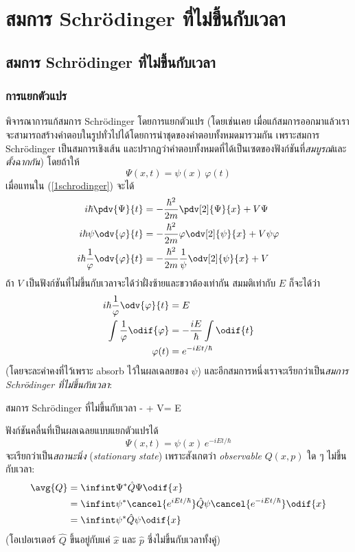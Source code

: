 \chapter{สมการ Schrödinger ที่ไม่ขึ้นกับเวลา}

\section{สมการ Schrödinger ที่ไม่ขึ้นกับเวลา}

\subsection{การแยกตัวแปร}

พิจารณาการแก้สมการ Schrödinger โดยการแยกตัวแปร (โดยเช่นเคย เมื่อแก้สมการออกมาแล้วเราจะสามารถสร้างคำตอบในรูปทั่วไปได้โดยการนำชุดของคำตอบทั้งหมดมารวมกัน เพราะสมการ Schrödinger เป็นสมการเชิงเส้น และปรากฏว่าคำตอบทั้งหมดที่ได้เป็นเซตของฟังก์ชันที่\emph{สมบูรณ์}และ\emph{ตั้งฉากกัน}) โดยถ้าให้
\[
\Psi(x, t) = \psi(x)\,\varphi(t)
\]
เมื่อแทนใน (\ref{1schrodinger}) จะได้
\begin{align*}
    i\hbar\pdv{\Psi}{t} &= -\frac{\hbar^2}{2m} \pdv[2]{\Psi}{x} + V\Psi\\
    i\hbar\psi\odv{\varphi}{t} &= -\frac{\hbar^2}{2m}\varphi\odv[2]{\psi}{x} + V\psi\varphi\\
    i\hbar\frac{1}{\varphi}\odv{\varphi}{t} &= -\frac{\hbar^2}{2m}\frac{1}{\psi}\odv[2]{\psi}{x} + V
\end{align*}
ถ้า $V$ เป็นฟังก์ชันที่ไม่ขึ้นกับเวลาจะได้ว่าฝั่งซ้ายและขวาต้องเท่ากัน สมมติเท่ากับ $E$ ก็จะได้ว่า
\begin{align}
    i\hbar\frac{1}{\varphi}\odv{\varphi}{t} &= E\notag\\
    \int\frac{1}{\varphi}\odif{\varphi} &= -\frac{iE}{\hbar}\int\odif{t}\notag\\
    \varphi(t) &= e^{-iEt/\hbar}
\end{align}
(โดยจะละค่าคงที่ไว้เพราะ absorb ไว้ในผลเฉลยของ $\psi$) และอีกสมการหนึ่งเราจะเรียกว่าเป็น\emph{สมการ Schrödinger ที่ไม่ขึ้นกับเวลา}: 
\begin{ieqbox}{สมการ Schrödinger ที่ไม่ขึ้นกับเวลา}
    - + V\psi = E\psi\label{2timeindepschrodinger}
\end{ieqbox}

ฟังก์ชันคลื่นที่เป็นผลเฉลยแบบแยกตัวแปรได้
\begin{equation}
    \Psi(x, t) = \psi(x)\,e^{-iEt/\hbar}
\end{equation}
จะเรียกว่าเป็น\emph{สถานะนิ่ง} (\emph{stationary state}) เพราะสังเกตว่า \emph{observable} $Q(x, p)$ ใด ๆ ไม่ขึ้นกับเวลา:
\begin{align*}
    \avg{Q} &= \infint \Psi^*\hat{Q}\Psi \odif{x}\\
    &= \infint \psi^*\cancel{e^{iEt/\hbar}}\hat{Q}\psi \cancel{e^{-iEt/\hbar}} \odif{x}\\
    &= \infint \psi^*\hat{Q}\psi \odif{x}
\end{align*}
(โอเปอเรเตอร์ $\hat{Q}$ ขึ้นอยู่กับแค่ $\hat{x}$ และ $\hat{p}$ ซึ่งไม่ขึ้นกับเวลาทั้งคู่)

